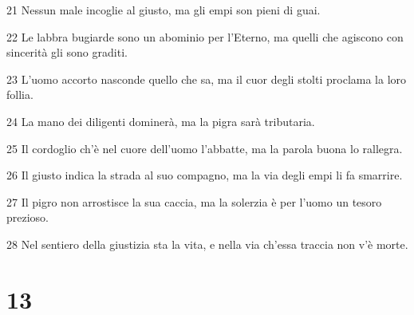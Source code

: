\par 21 Nessun male incoglie al giusto, ma gli empi son pieni di guai.
\par 22 Le labbra bugiarde sono un abominio per l'Eterno, ma quelli che agiscono con sincerità gli sono graditi.
\par 23 L'uomo accorto nasconde quello che sa, ma il cuor degli stolti proclama la loro follia.
\par 24 La mano dei diligenti dominerà, ma la pigra sarà tributaria.
\par 25 Il cordoglio ch'è nel cuore dell'uomo l'abbatte, ma la parola buona lo rallegra.
\par 26 Il giusto indica la strada al suo compagno, ma la via degli empi li fa smarrire.
\par 27 Il pigro non arrostisce la sua caccia, ma la solerzia è per l'uomo un tesoro prezioso.
\par 28 Nel sentiero della giustizia sta la vita, e nella via ch'essa traccia non v'è morte.

\chapter{13}

